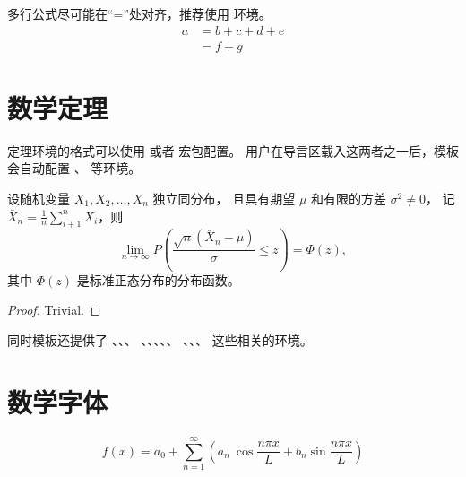 多行公式尽可能在“=”处对齐，推荐使用  环境。
\begin{align}
  a & = b + c + d + e \\
    & = f + g
\end{align}



\section{数学定理}

定理环境的格式可以使用  或者  宏包配置。
用户在导言区载入这两者之一后，模板会自动配置 、 等环境。

\begin{theorem}
  设随机变量 $X_1, X_2, \dots, X_n$ 独立同分布， 且具有期望 $\mu$ 和有限的方差 $\sigma^2 \ne 0$，
  记 $\bar{X}_n = \frac{1}{n} \sum_{i+1}^n X_i$，则
  \begin{equation}
    \lim_{n \to \infty} P \left(\frac{\sqrt{n} \left( \bar{X}_n - \mu \right)}{\sigma} \le z \right) = \Phi(z),
  \end{equation}
  其中 $\Phi(z)$ 是标准正态分布的分布函数。
\end{theorem}
\begin{proof}
  Trivial.
\end{proof}

同时模板还提供了 、、、
、、、、、
、、、 这些相关的环境。

\section{数学字体}

\begin{equation}
  f(x)=a_0+ \sum_{n=1}^{\infty}   \left(  a_n\ \cos \frac{n\pi x}{L} +b_n  \sin⁡ \frac{n\pi x}{L}   \right)
\end{equation}